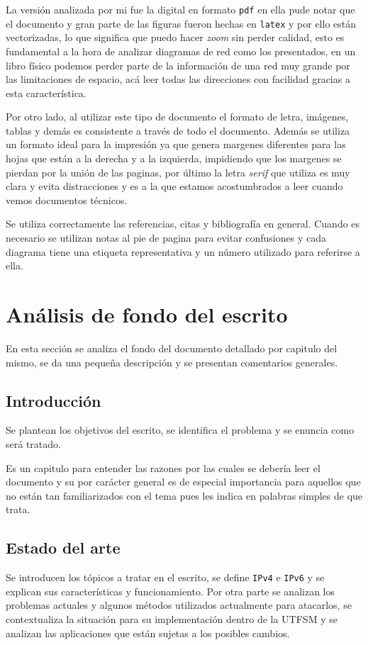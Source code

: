 \documentclass[spanish, fleqn]{article}
\let\e\emph
\begin{document}
    La versión analizada por mi fue la digital en formato \texttt{pdf} en ella
    pude notar que el documento y gran parte de las figuras fueron hechas en
    \texttt{latex} y por ello están vectorizadas, lo que significa que puedo
    hacer \e{zoom} sin perder calidad, esto es fundamental a la hora de analizar
    diagramas de red como los presentados, en un libro físico podemos perder
    parte de la información de una red muy grande por las limitaciones de
    espacio, acá leer todas las direcciones con facilidad gracias a esta
    característica. 

    Por otro lado, al utilizar este tipo de documento el formato de letra,
    imágenes, tablas y demás es consistente a través de todo el documento.
    Además se utiliza un formato ideal para la impresión ya que genera margenes
    diferentes para las hojas que están a la derecha y a la izquierda,
    impidiendo que los margenes se pierdan por la unión de las paginas, por
    último la letra \e{serif} que utiliza es muy clara y evita distracciones y
    es a la que estamos acostumbrados a leer cuando vemos documentos técnicos.

    Se utiliza correctamente las referencias, citas y bibliografía en general.
    Cuando es necesario se utilizan notas al pie de pagina para evitar
    confusiones y cada diagrama tiene una etiqueta representativa y un número
    utilizado para referirse a ella.

\newpage{}
\section{Análisis de fondo del escrito}
    En esta sección se analiza el fondo del documento detallado por capitulo del
    mismo, se da una pequeña descripción y se presentan comentarios generales.
    \subsection{Introducción}
    Se plantean los objetivos del escrito, se identifica el problema y se
    enuncia como será tratado. 

    Es un capitulo para entender las razones por las cuales se debería leer el
    documento y su por carácter general es de especial importancia para aquellos
    que no están tan familiarizados con el tema pues les indica en palabras
    simples de que trata.

    \subsection{Estado del arte}
    Se introducen los tópicos a tratar en el escrito, se define \texttt{IPv4}
    e \texttt{IPv6} y se explican sus características y funcionamiento. Por otra
    parte se analizan los problemas actuales y algunos métodos utilizados
    actualmente para atacarlos, se contextualiza la situación para su
    implementación dentro de la UTFSM y se analizan las aplicaciones que están
    sujetas a los posibles cambios.
\end{document}
